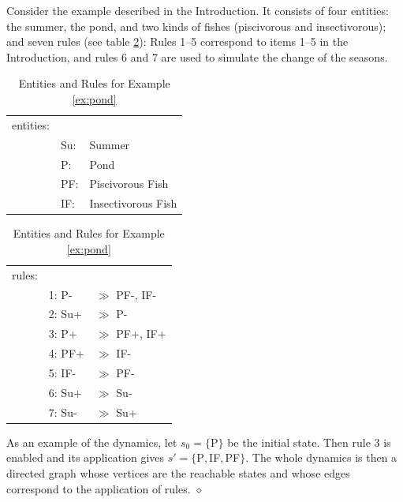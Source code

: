 \documentclass[a4paper,twoside]{article}
\begin{document}
\begin{example}[Pond] \label{ex:pond}
Consider the example described in the Introduction. It consists of four entities: the summer, the pond, and two kinds of fishes (piscivorous and insectivorous); and seven rules (see table \ref{tab:pond}): Rules 1--5 correspond to items 1--5 in the Introduction, and rules 6 and 7 are used to simulate the change of the seasons.
\begin{table}[t]
\centering
\begin{tabular}{lll}
entities:&& \\
    &Su: &Summer \\
    &P: &Pond \\
    &PF: &Piscivorous Fish  \\
    &IF: &Insectivorous Fish
\end{tabular} \qquad 
\begin{tabular}{lll}
rules:&& \\
    &1: P- & $\gg$ PF-, IF-  \\
    &2: Su+ &$\gg$  P-  \\
    &3: P+  &$\gg$ PF+, IF+  \\
    &4: PF+ &$\gg$ IF-  \\
    &5: IF- &$\gg$ PF- \\
    &6: Su+ &$\gg$ Su- \\
    &7: Su- &$\gg$ Su+ 
\end{tabular}
\caption{Entities and Rules for Example \ref{ex:pond}}\label{tab:pond}
\end{table}

As an example of the dynamics, let $s_0=\{$P$\}$ be the initial state. Then rule 3 is enabled and its application gives $s'=\{$P$, $IF$, $PF$\}$.
The whole dynamics is then a directed graph whose vertices are the reachable states and whose edges correspond to the application of rules.
\hfill $\diamond$
\end{example}
\end{document}
